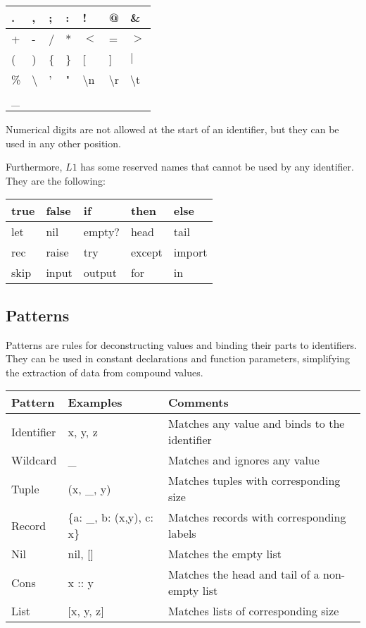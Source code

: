 \documentclass{article}
\begin{document}
\begin{tabular}{|l|l|l|l|l|l|l|}
  \hline
  . & , & ; & : & ! & @ & \&\\
  \hline
  + & - & / & * & $<$ & = & $>$ \\
  \hline
  ( & ) & \{ & \} & [ & ] & $|$ \\
  \hline
  \% & \textbackslash & ' & " & \textbackslash n & \textbackslash r & \textbackslash t\\
  \hline
  \_\\
  \hline
\end{tabular}

\bigskip

Numerical digits are not allowed at the start of an identifier, but they can be used in any other position.

Furthermore, $L1$ has some reserved names that cannot be used by any identifier.
They are the following:

\medskip

\begin{tabular}{|l|l|l|l|l|}
  \hline
  true & false & if & then & else\\
  \hline
  let & nil & empty? & head & tail\\
  \hline
  rec & raise & try & except & 	import\\
  \hline
  skip & input & output & for & in\\
  \hline
\end{tabular}

\subsection{Patterns}

Patterns are rules for deconstructing values and binding their parts to identifiers.
They can be used in constant declarations and function parameters, simplifying the extraction of data from compound values.

\medskip

\begin{tabular}{|l|l|l|}
  \hline
  \textbf{Pattern} & \textbf{Examples} & \textbf{Comments}\\
  \hline
  Identifier & x, y, z & Matches any value and binds to the identifier\\
  \hline
  Wildcard & _ & Matches and ignores any value\\
  \hline
  Tuple & (x, _, y) & Matches tuples with corresponding size\\
  \hline
  Record & \{a: _, b: (x,y), c: x\} & Matches records with corresponding labels\\
  \hline
  Nil & nil, [] & Matches the empty list\\
  \hline
  Cons & x :: y & Matches the head and tail of a non-empty list\\
  \hline
  List & [x, y, z] & Matches lists of corresponding size\\
  \hline
\end{tabular}
\end{document}
